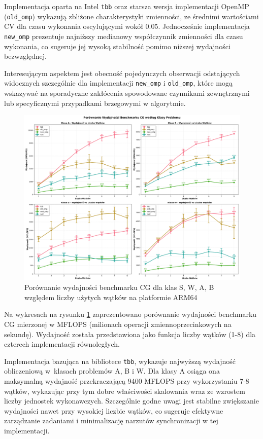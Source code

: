 Implementacja oparta na Intel \texttt{tbb} oraz starsza wersja implementacji OpenMP (\texttt{old\_omp}) wykazują zbliżone charakterystyki zmienności, ze średnimi wartościami CV dla czasu wykonania oscylującymi wokół 0.05. Jednocześnie implementacja \texttt{new\_omp} prezentuje najniższy medianowy współczynnik zmienności dla czasu wykonania, co sugeruje jej wysoką stabilność pomimo niższej wydajności bezwzględnej.

Interesującym aspektem jest obecność pojedynczych obserwacji odstających widocznych szczególnie dla implementacji \texttt{new\_omp} i \texttt{old\_omp}, które mogą wskazywać na sporadyczne zakłócenia spowodowane czynnikami zewnętrznymi lub specyficznymi przypadkami brzegowymi w algorytmie.

\begin{figure}[H]
    \centering
    \includegraphics[width=\textwidth]{analiza/images/parallel/cg/x86/cg_porownanie_wydajnosci.png}
    \caption{Porównanie wydajności benchmarku CG dla klas S, W, A, B względem liczby użytych wątków na platformie ARM64}
    \label{cg_porownanie_wydajnosci_x86_64}
\end{figure}
Na wykresach na rysunku \ref{cg_porownanie_wydajnosci_x86_64} zaprezentowano porównanie wydajności benchmarku CG mierzonej w MFLOPS (milionach operacji zmiennoprzecinkowych na sekundę). Wydajność została przedstawiona jako funkcja liczby wątków (1-8) dla czterech implementacji równoległych.

Implementacja bazująca na bibliotece \texttt{tbb}, wykazuje najwyższą wydajność obliczeniową w~klasach problemów A, B i W. Dla klasy A osiąga ona maksymalną wydajność przekraczającą 9400 MFLOPS przy wykorzystaniu 7-8 wątków, wykazując przy tym dobre właściwości skalowania wraz ze wzrostem liczby jednostek wykonawczych. Szczególnie godne uwagi jest stabilne zwiększanie wydajności nawet przy wysokiej liczbie wątków, co sugeruje efektywne zarządzanie zadaniami i minimalizację narzutów synchronizacji w tej implementacji.

